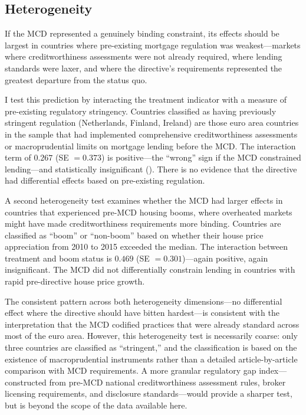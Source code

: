 \documentclass[12pt]{article}
\begin{document}
\subsection{Heterogeneity}



If the MCD represented a genuinely binding constraint, its effects should be largest in countries where pre-existing mortgage regulation was weakest---markets where creditworthiness assessments were not already required, where lending standards were laxer, and where the directive's requirements represented the greatest departure from the status quo.

I test this prediction by interacting the treatment indicator with a measure of pre-existing regulatory stringency. Countries classified as having previously stringent regulation (Netherlands, Finland, Ireland) are those euro area countries in the sample that had implemented comprehensive creditworthiness assessments or macroprudential limits on mortgage lending before the MCD. The interaction term of $0.267$ (SE $= 0.373$) is positive---the ``wrong'' sign if the MCD constrained lending---and statistically insignificant (). There is no evidence that the directive had differential effects based on pre-existing regulation.

A second heterogeneity test examines whether the MCD had larger effects in countries that experienced pre-MCD housing booms, where overheated markets might have made creditworthiness requirements more binding. Countries are classified as ``boom'' or ``non-boom'' based on whether their house price appreciation from 2010 to 2015 exceeded the median. The interaction between treatment and boom status is $0.469$ (SE $= 0.301$)---again positive, again insignificant. The MCD did not differentially constrain lending in countries with rapid pre-directive house price growth.

The consistent pattern across both heterogeneity dimensions---no differential effect where the directive should have bitten hardest---is consistent with the interpretation that the MCD codified practices that were already standard across most of the euro area. However, this heterogeneity test is necessarily coarse: only three countries are classified as ``stringent,'' and the classification is based on the existence of macroprudential instruments rather than a detailed article-by-article comparison with MCD requirements. A more granular regulatory gap index---constructed from pre-MCD national creditworthiness assessment rules, broker licensing requirements, and disclosure standards---would provide a sharper test, but is beyond the scope of the data available here.
\end{document}
